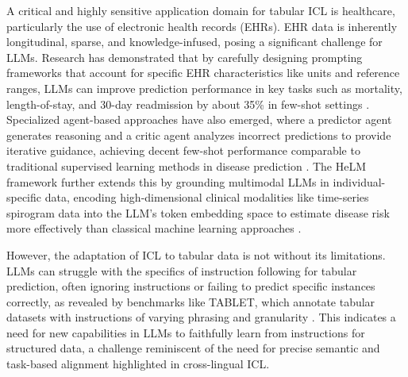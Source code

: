 \documentclass[11pt]{article}
\begin{document}
A critical and highly sensitive application domain for tabular ICL is healthcare, particularly the use of electronic health records (EHRs). EHR data is inherently longitudinal, sparse, and knowledge-infused, posing a significant challenge for LLMs. Research has demonstrated that by carefully designing prompting frameworks that account for specific EHR characteristics like units and reference ranges, LLMs can improve prediction performance in key tasks such as mortality, length-of-stay, and 30-day readmission by about 35\% in few-shot settings \cite{ref551}. Specialized agent-based approaches have also emerged, where a predictor agent generates reasoning and a critic agent analyzes incorrect predictions to provide iterative guidance, achieving decent few-shot performance comparable to traditional supervised learning methods in disease prediction \cite{ref552}. The HeLM framework further extends this by grounding multimodal LLMs in individual-specific data, encoding high-dimensional clinical modalities like time-series spirogram data into the LLM's token embedding space to estimate disease risk more effectively than classical machine learning approaches \cite{ref553}.

However, the adaptation of ICL to tabular data is not without its limitations. LLMs can struggle with the specifics of instruction following for tabular prediction, often ignoring instructions or failing to predict specific instances correctly, as revealed by benchmarks like TABLET, which annotate tabular datasets with instructions of varying phrasing and granularity \cite{ref554}. This indicates a need for new capabilities in LLMs to faithfully learn from instructions for structured data, a challenge reminiscent of the need for precise semantic and task-based alignment highlighted in cross-lingual ICL.
\end{document}
